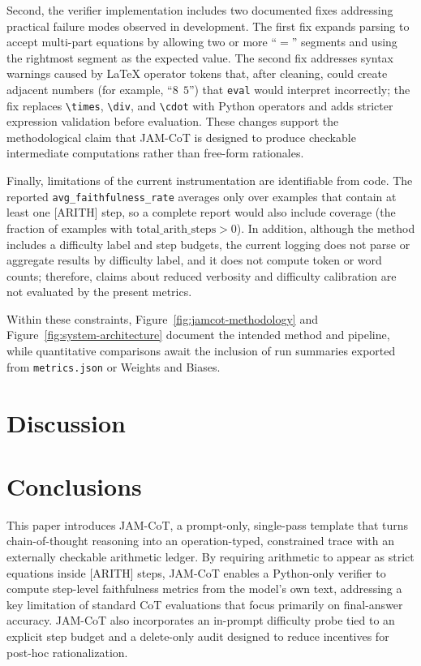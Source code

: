 \documentclass[journal,article,submit,pdftex,moreauthors]{Definitions/mdpi}
\begin{document}
Second, the verifier implementation includes two documented fixes addressing practical failure modes observed in development. The first fix expands parsing to accept multi-part equations by allowing two or more ``$=$'' segments and using the rightmost segment as the expected value. The second fix addresses syntax warnings caused by LaTeX operator tokens that, after cleaning, could create adjacent numbers (for example, ``$8\ \ 5$'') that \verb|eval| would interpret incorrectly; the fix replaces \verb|\times|, \verb|\div|, and \verb|\cdot| with Python operators and adds stricter expression validation before evaluation. These changes support the methodological claim that JAM-CoT is designed to produce checkable intermediate computations rather than free-form rationales.

Finally, limitations of the current instrumentation are identifiable from code. The reported \verb|avg_faithfulness_rate| averages only over examples that contain at least one [ARITH] step, so a complete report would also include coverage (the fraction of examples with $\text{total\_arith\_steps} > 0$). In addition, although the method includes a difficulty label and step budgets, the current logging does not parse or aggregate results by difficulty label, and it does not compute token or word counts; therefore, claims about reduced verbosity and difficulty calibration are not evaluated by the present metrics.

Within these constraints, Figure~\ref{fig:jamcot-methodology} and Figure~\ref{fig:system-architecture} document the intended method and pipeline, while quantitative comparisons await the inclusion of run summaries exported from \verb|metrics.json| or Weights and Biases.

\section{Discussion}



\section{Conclusions}

This paper introduces JAM-CoT, a prompt-only, single-pass template that turns chain-of-thought reasoning into an operation-typed, constrained trace with an externally checkable arithmetic ledger. By requiring arithmetic to appear as strict equations inside [ARITH] steps, JAM-CoT enables a Python-only verifier to compute step-level faithfulness metrics from the model’s own text, addressing a key limitation of standard CoT evaluations that focus primarily on final-answer accuracy. JAM-CoT also incorporates an in-prompt difficulty probe tied to an explicit step budget and a delete-only audit designed to reduce incentives for post-hoc rationalization.
\end{document}
